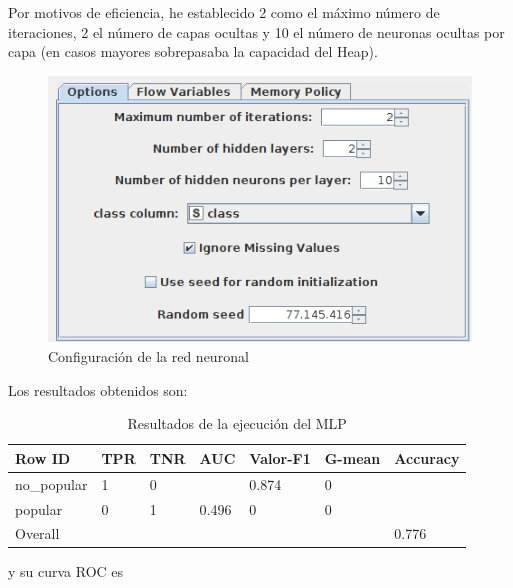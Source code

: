Por motivos de eficiencia, he establecido 2 como el máximo número de iteraciones, 2 el número de capas ocultas y 10 el número de neuronas ocultas por capa (en casos mayores sobrepasaba la capacidad del Heap). 

\begin{figure}[H] %
	\centering
	\includegraphics[scale=0.33]{conf-rn-p.png}  %
	\caption{Configuración de la red neuronal} 
	\label{fig:conf-rn}
\end{figure}

Los resultados obtenidos son:

\begin{table}[H]
	\centering
	\begin{tabular}{|l|l|l|l|l|l|l|}
		\hline
		Row ID      & TPR & TNR & AUC   & Valor-F1 & G-mean & Accuracy \\ \hline
		no\_popular & 1   & 0   &       & 0.874    & 0      &          \\ \hline
		popular     & 0   & 1   & 0.496 & 0        & 0      &          \\ \hline
		Overall     &     &     &       &          &        & 0.776    \\ \hline
	\end{tabular}
	\caption{Resultados de la ejecución del MLP}
	\label{tab:mlp}
\end{table}

y su curva ROC es

